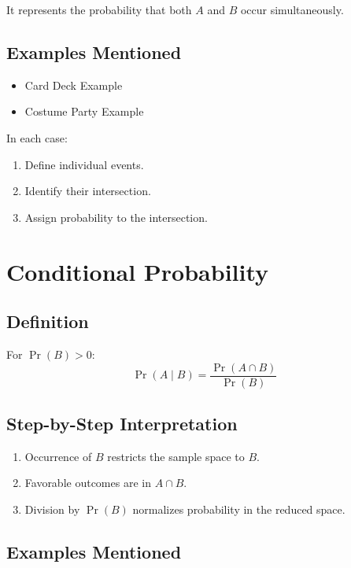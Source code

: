 \documentclass[12pt,a4paper]{article}
\begin{document}
It represents the probability that both $A$ and $B$ occur simultaneously.

\subsection{Examples Mentioned}

\begin{itemize}
    \item Card Deck Example
    \item Costume Party Example
\end{itemize}

In each case:
\begin{enumerate}
    \item Define individual events.
    \item Identify their intersection.
    \item Assign probability to the intersection.
\end{enumerate}

\section{Conditional Probability}

\subsection{Definition}

For $\Pr(B) > 0$:
\[
\Pr(A \mid B) = \frac{\Pr(A \cap B)}{\Pr(B)}
\]

\subsection{Step-by-Step Interpretation}

\begin{enumerate}
    \item Occurrence of $B$ restricts the sample space to $B$.
    \item Favorable outcomes are in $A \cap B$.
    \item Division by $\Pr(B)$ normalizes probability in the reduced space.
\end{enumerate}

\subsection{Examples Mentioned}
\end{document}
